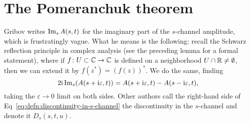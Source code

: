 
\section{The Pomeranchuk theorem}

Gribov writes $\operatorname{Im}_{s}A(s,t)$ for the imaginary part of the
$s$-channel amplitude, which is frustratingly vague. What he means is
the following: recall the Schwarz reflection principle in complex
analysis (see the preceding lemma for a formal statement), where if
$f\colon U\subset\mathbb{C}\to\mathbb{C}$ is defined on a
neighborhood $U\cap\mathbb{R}\neq\emptyset$, then we can extend it by
$f(z^{*})=(f(z))^{*}$.
We do the same, finding
\begin{equation}\label{eq:defn:discontinuity-in-s-channel}
2\mathrm{i}\operatorname{Im}_{s}(A(s+\mathrm{i}\varepsilon,t)) = A(s+\mathrm{i}\varepsilon,t)-A(s-\mathrm{i}\varepsilon,t),
\end{equation}
taking the $\varepsilon\to0$ limit on both sides.
Other authors call the right-hand side of Eq~\eqref{eq:defn:discontinuity-in-s-channel} the discontinuity in the $s$-channel and denote
it $D_{s}(s,t,u)$.
